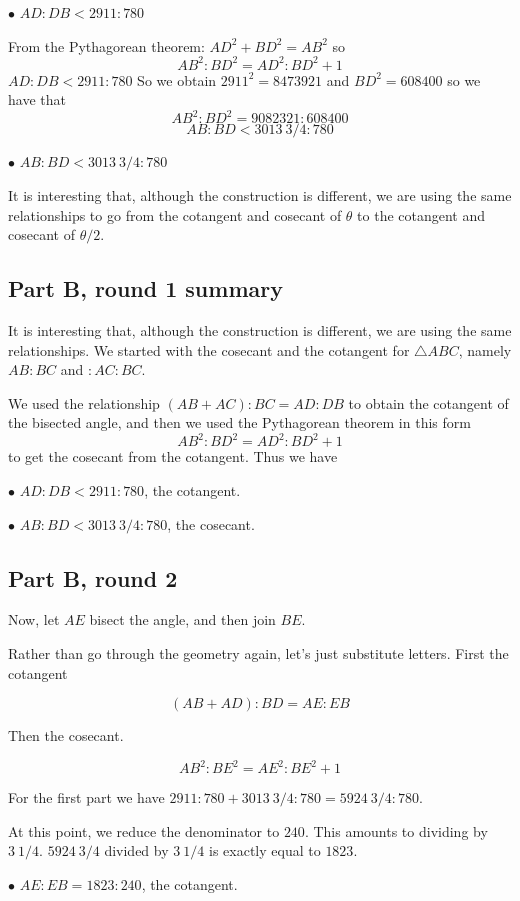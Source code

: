 \documentclass[11pt, oneside]{article}
\begin{document}
$\bullet$  $AD : DB < 2911 : 780$

From the Pythagorean theorem:  $AD^2 + BD^2 = AB^2$ so
\[ AB^2:BD^2 = AD^2:BD^2 + 1 \]
$AD : DB < 2911 : 780$  So we obtain $2911^2 = 8473921$ and $BD^2 = 608400$ so we have that
\[ AB^2:BD^2 =  9082321: 608400 \]
\[ AB:BD <  3013 \ 3/4: 780 \]

$\bullet$  $AB : BD < 3013 \ 3/4 : 780$

It is interesting that, although the construction is different, we are using the same relationships to go from the cotangent and cosecant of $\theta$ to the cotangent and cosecant of $\theta/2$.

\subsection*{Part B, round 1 summary}
It is interesting that, although the construction is different, we are using the same relationships.  We started with the cosecant and the cotangent for $\triangle ABC$, namely $AB:BC$ and $:AC:BC$.

We used the relationship $(AB + AC):BC = AD:DB$ to obtain the cotangent of the bisected angle, and then we used the Pythagorean theorem in this form
\[ AB^2:BD^2 = AD^2:BD^2 + 1 \]
to get the cosecant from the cotangent.  Thus we have

$\bullet$  $AD : DB < 2911 : 780$, the cotangent.

$\bullet$  $AB : BD < 3013 \ 3/4 : 780$, the cosecant.

\subsection*{Part B, round 2}

Now, let $AE$ bisect the angle, and then join $BE$.

Rather than go through the geometry again, let's just substitute letters.  First the cotangent

\[ (AB + AD):BD = AE:EB \]

Then the cosecant.

\[ AB^2:BE^2 = AE^2:BE^2 + 1 \]

For the first part we have $2911:780 + 3013 \ 3/4:780 = 5924 \ 3/4:780$.  

At this point, we reduce the denominator to $240$.  This amounts to dividing by $3 \ 1/4$.  $5924 \ 3/4$ divided by $3 \ 1/4$ is exactly equal to $1823$.

$\bullet$ $AE:EB = 1823:240$, the cotangent.
\end{document}
